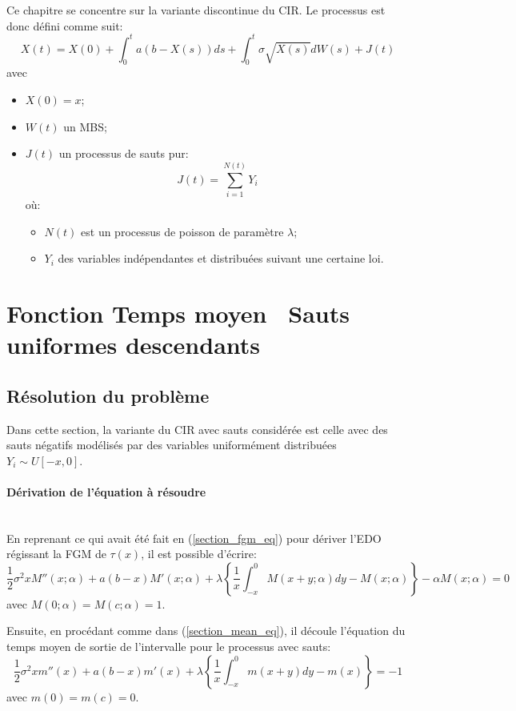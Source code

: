 \label{sec:FPT_Jump}
Ce chapitre se concentre sur la variante discontinue du \acs{CIR}. Le processus est donc défini comme suit:
\begin{equation}\label{jump_cir_sde}
    X(t)=X(0)+\int_0^t a(b-X(s))ds+\int_0^t\sigma\sqrt{X(s)}dW(s)+J(t)
\end{equation}
avec
\begin{itemize}
    \item $X(0)=x$;
    \item $W(t)$ un \acs{MBS};
    \item $J(t)$ un processus de sauts pur:
    \[
    J(t)=\sum_{i=1}^{N(t)}Y_i
    \]
    où:
    \begin{itemize}
        \item $N(t)$ est un processus de poisson de paramètre $\lambda$;
        \item $Y_i$ des variables indépendantes et distribuées suivant une certaine loi.
    \end{itemize}
\end{itemize}

\section{Fonction Temps moyen \textemdash~Sauts uniformes descendants}\label{subsection_mean_jumps}
\subsection{Résolution du problème}
Dans cette section, la variante du \ac{CIR} avec sauts considérée est celle avec des sauts négatifs modélisés par des variables uniformément distribuées $Y_i\sim U[-x,0]$.

\paragraph{Dérivation de l'équation à résoudre}\phantom{}\\
En reprenant ce qui avait été fait en (\ref{section_fgm_eq}) pour dériver l'\acs{EDO} régissant la \acl{FGM} de $\tau(x)$, il est possible d'écrire:
\[
\frac{1}{2}\sigma^2 xM''(x;\alpha)+a(b-x)M'(x;\alpha)+\lambda\left\{\frac{1}{x}\int_{-x}^0M(x+y;\alpha)dy-M(x;\alpha)\right\}-\alpha M(x;\alpha)=0
\]
avec $M(0;\alpha)=M(c;\alpha)=1$.

Ensuite, en procédant comme dans (\ref{section_mean_eq}), il découle l'équation du temps moyen de sortie de l'intervalle pour le processus avec sauts:
\begin{equation}\label{mean_ide}
    \frac{1}{2}\sigma^2 xm''(x)+a(b-x)m'(x)+\lambda\left\{\frac{1}{x}\int_{-x}^0m(x+y)dy-m(x)\right\}=-1
\end{equation}
avec $m(0)=m(c)=0$.

